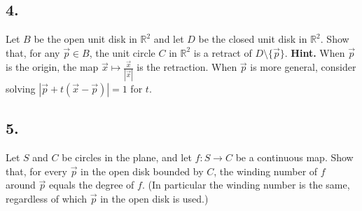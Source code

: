 \documentclass{amsart}
\theoremstyle{plain}
\theoremstyle{definition}
\theoremstyle{remark}
\begin{document}
\vspace{.15in}
\noindent
\subsection*{4.} Let $B$ be the open unit disk in $\mathbb R ^2$ and let $D$ be the closed unit disk in $\mathbb R ^2$. Show that, for any $\vec{p} \in B$, the unit circle $C$ in $\mathbb R ^2$ is a retract of $D\setminus \{ \vec{p}\}$. {\bf Hint.} When $\vec{p}$ is the origin, the map $\vec{x} \mapsto \frac{\vec{x}}{|\vec{x}|}$ is the retraction. When $\vec{p}$ is more general, consider solving $|\vec{p} + t(\vec{x}-\vec{p})| = 1$ for $t$. 



\vspace{.15in}
\noindent
\subsection*{5.} Let $S$ and $C$ be circles in the plane, and let $f : S\to C$ be a continuous map. Show that, for every $\vec{p}$ in the open disk bounded by $C$, the winding number of $f$ around $\vec{p}$ equals the degree of $f$. (In particular the winding number is the same, regardless of which $\vec{p}$ in the open disk is used.) 
 
\end{document}
